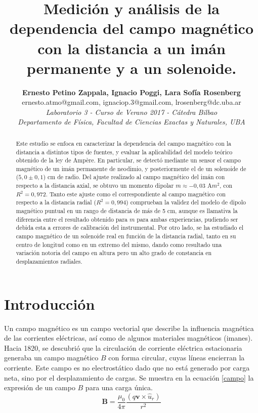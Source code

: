 \documentclass[12pt]{article}
\title{\textbf{Medición y análisis de la dependencia del campo magnético con la distancia a un imán permanente y a un solenoide.} \vspace{4mm} }
\author{
\textbf{Ernesto Petino Zappala, Ignacio Poggi, Lara Sofía Rosenberg} \vspace{2mm} \\
ernesto.atmo@gmail.com, ignaciop.3@gmail.com, lrosenberg@dc.uba.ar \vspace{2mm} \\
\textit{Laboratorio 3 - Curso de Verano 2017 - Cátedra Bilbao}\\
\textit{Departamento de Física, Facultad de Ciencias Exactas y Naturales, UBA}
}
\date{ }
\begin{document}
\maketitle

\begin{abstract}
Este estudio se enfoca en caracterizar la dependencia del campo magnético con la distancia a distintos tipos de fuentes, y evaluar la aplicabilidad del modelo teórico obtenido de la ley de Ampère. En particular,  se detectó mediante un sensor el campo magnético de un imán permanente de neodimio, y posteriormente el de un solenoide de ($5,0 \pm 0,1$) cm de radio. Del ajuste realizado al campo magnético del imán con respecto a la distancia axial, se obtuvo un momento dipolar $m\approx -0,03$ A$m^{2}$, con $R^2=0,972$. Tanto este ajuste como el correspondiente al campo magnético con respecto a la distancia radial ($R^2=0,994$) comprueban la validez del modelo de dipolo magnético puntual en un rango de distancia de más de 5 cm, aunque es llamativa la diferencia entre el resultado obtenido para $m$ para ambas experiencias, pudiendo ser debida esta a errores de calibración del instrumental. Por otro lado, se ha estudiado el campo magnético de un solenoide real en función de la distancia radial, tanto en su centro de longitud como en un extremo del mismo, dando como resultado una variación notoria del campo en altura pero un alto grado de constancia en desplazamientos radiales.

\end{abstract}

\section{Introducción}

Un campo magnético es un campo vectorial que describe la influencia magnética de las corrientes eléctricas, así como de algunos materiales magnéticos (imanes). \\

Hacia 1820, se descubrió que la circulación de corriente eléctrica estacionaria generaba un campo magnético $B$ con forma circular, cuyas líneas encierran la corriente. Este campo es no electrostático dado que no está generado por carga neta, sino por el desplazamiento de cargas. Se muestra en la ecuación \ref{campo} la expresión de un campo $B$ para una carga única.\\

\begin{equation}
    \textbf{B}=\frac{\mu_0}{4\pi}\frac{(q\textbf{v}\times\textbf{$\hat{u}_r$})}{r^2}
    \label{campo}
\end{equation}
\end{document}
